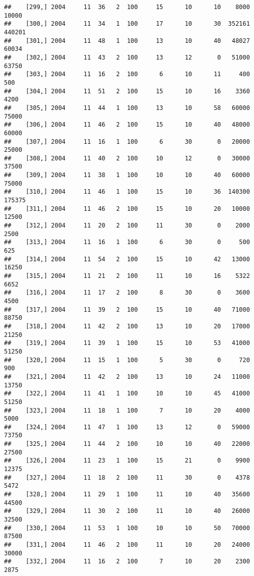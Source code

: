 \documentclass{article}\usepackage[]{graphicx}\usepackage[]{color}
\makeatletter
\newenvironment{kframe}{%
 \def\at@end@of@kframe{}%
 \ifinner\ifhmode%
  \def\at@end@of@kframe{\end{minipage}}%
  \begin{minipage}{\columnwidth}%
 \fi\fi%
 \def\FrameCommand##1{\hskip\@totalleftmargin \hskip-\fboxsep
 \colorbox{shadecolor}{##1}\hskip-\fboxsep
     \hskip-\linewidth \hskip-\@totalleftmargin \hskip\columnwidth}%
 \MakeFramed {\advance\hsize-\width
   \@totalleftmargin\z@ \linewidth\hsize
   \@setminipage}}%
 {\par\unskip\endMakeFramed%
 \at@end@of@kframe}
\newenvironment{knitrout}{}{} %
\makeatother
\begin{document}
\begin{knitrout}
\begin{kframe}
\begin{verbatim}
##    [299,] 2004     11  36   2  100     15      10      10    8000   10000
##    [300,] 2004     11  34   1  100     17      10      30  352161  440201
##    [301,] 2004     11  48   1  100     13      10      40   48027   60034
##    [302,] 2004     11  43   2  100     13      12       0   51000   63750
##    [303,] 2004     11  16   2  100      6      10      11     400     500
##    [304,] 2004     11  51   2  100     15      10      16    3360    4200
##    [305,] 2004     11  44   1  100     13      10      58   60000   75000
##    [306,] 2004     11  46   2  100     15      10      40   48000   60000
##    [307,] 2004     11  16   1  100      6      30       0   20000   25000
##    [308,] 2004     11  40   2  100     10      12       0   30000   37500
##    [309,] 2004     11  38   1  100     10      10      40   60000   75000
##    [310,] 2004     11  46   1  100     15      10      36  140300  175375
##    [311,] 2004     11  46   2  100     15      10      20   10000   12500
##    [312,] 2004     11  20   2  100     11      30       0    2000    2500
##    [313,] 2004     11  16   1  100      6      30       0     500     625
##    [314,] 2004     11  54   2  100     15      10      42   13000   16250
##    [315,] 2004     11  21   2  100     11      10      16    5322    6652
##    [316,] 2004     11  17   2  100      8      30       0    3600    4500
##    [317,] 2004     11  39   2  100     15      10      40   71000   88750
##    [318,] 2004     11  42   2  100     13      10      20   17000   21250
##    [319,] 2004     11  39   1  100     15      10      53   41000   51250
##    [320,] 2004     11  15   1  100      5      30       0     720     900
##    [321,] 2004     11  42   2  100     13      10      24   11000   13750
##    [322,] 2004     11  41   1  100     10      10      45   41000   51250
##    [323,] 2004     11  18   1  100      7      10      20    4000    5000
##    [324,] 2004     11  47   1  100     13      12       0   59000   73750
##    [325,] 2004     11  44   2  100     10      10      40   22000   27500
##    [326,] 2004     11  23   1  100     15      21       0    9900   12375
##    [327,] 2004     11  18   2  100     11      30       0    4378    5472
##    [328,] 2004     11  29   1  100     11      10      40   35600   44500
##    [329,] 2004     11  30   2  100     11      10      40   26000   32500
##    [330,] 2004     11  53   1  100     10      10      50   70000   87500
##    [331,] 2004     11  46   2  100     11      10      20   24000   30000
##    [332,] 2004     11  16   2  100      7      10      20    2300    2875

\end{verbatim}
\end{kframe}
\end{knitrout}
\end{document}
